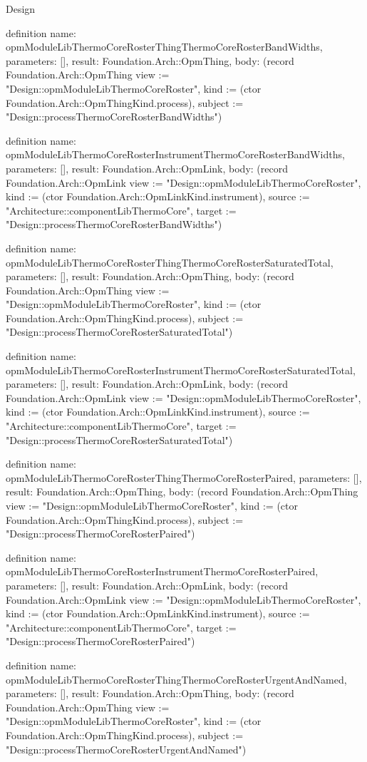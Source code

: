 \begin{lexlean}{Design}
\begin{semanticmodule}
definition{
  name: opmModuleLibThermoCoreRosterThingThermoCoreRosterBandWidths,
  parameters: [],
  result: Foundation.Arch::OpmThing,
  body: (record Foundation.Arch::OpmThing {view := "Design::opmModuleLibThermoCoreRoster", kind := (ctor Foundation.Arch::OpmThingKind.process), subject := "Design::processThermoCoreRosterBandWidths"})
}

definition{
  name: opmModuleLibThermoCoreRosterInstrumentThermoCoreRosterBandWidths,
  parameters: [],
  result: Foundation.Arch::OpmLink,
  body: (record Foundation.Arch::OpmLink {view := "Design::opmModuleLibThermoCoreRoster", kind := (ctor Foundation.Arch::OpmLinkKind.instrument), source := "Architecture::componentLibThermoCore", target := "Design::processThermoCoreRosterBandWidths"})
}

definition{
  name: opmModuleLibThermoCoreRosterThingThermoCoreRosterSaturatedTotal,
  parameters: [],
  result: Foundation.Arch::OpmThing,
  body: (record Foundation.Arch::OpmThing {view := "Design::opmModuleLibThermoCoreRoster", kind := (ctor Foundation.Arch::OpmThingKind.process), subject := "Design::processThermoCoreRosterSaturatedTotal"})
}

definition{
  name: opmModuleLibThermoCoreRosterInstrumentThermoCoreRosterSaturatedTotal,
  parameters: [],
  result: Foundation.Arch::OpmLink,
  body: (record Foundation.Arch::OpmLink {view := "Design::opmModuleLibThermoCoreRoster", kind := (ctor Foundation.Arch::OpmLinkKind.instrument), source := "Architecture::componentLibThermoCore", target := "Design::processThermoCoreRosterSaturatedTotal"})
}

definition{
  name: opmModuleLibThermoCoreRosterThingThermoCoreRosterPaired,
  parameters: [],
  result: Foundation.Arch::OpmThing,
  body: (record Foundation.Arch::OpmThing {view := "Design::opmModuleLibThermoCoreRoster", kind := (ctor Foundation.Arch::OpmThingKind.process), subject := "Design::processThermoCoreRosterPaired"})
}

definition{
  name: opmModuleLibThermoCoreRosterInstrumentThermoCoreRosterPaired,
  parameters: [],
  result: Foundation.Arch::OpmLink,
  body: (record Foundation.Arch::OpmLink {view := "Design::opmModuleLibThermoCoreRoster", kind := (ctor Foundation.Arch::OpmLinkKind.instrument), source := "Architecture::componentLibThermoCore", target := "Design::processThermoCoreRosterPaired"})
}

definition{
  name: opmModuleLibThermoCoreRosterThingThermoCoreRosterUrgentAndNamed,
  parameters: [],
  result: Foundation.Arch::OpmThing,
  body: (record Foundation.Arch::OpmThing {view := "Design::opmModuleLibThermoCoreRoster", kind := (ctor Foundation.Arch::OpmThingKind.process), subject := "Design::processThermoCoreRosterUrgentAndNamed"})
}


\end{semanticmodule}
\end{lexlean}
